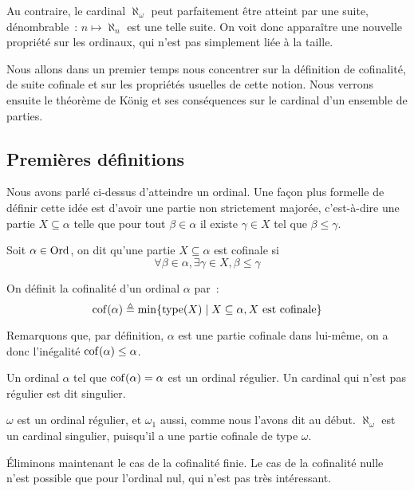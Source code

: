 Au contraire, le cardinal $\aleph_\omega$ peut parfaitement être atteint par
une suite, dénombrable~: $n \mapsto \aleph_n$ est une telle suite. On voit donc
apparaître une nouvelle propriété sur les ordinaux, qui n'est pas simplement
liée à la taille.

Nous allons dans un premier temps nous concentrer sur la définition de
cofinalité, de suite cofinale et sur les propriétés usuelles de cette notion.
Nous verrons ensuite le théorème de König et ses conséquences sur le cardinal
d'un ensemble de parties.

\subsection{Premières définitions}

Nous avons parlé ci-dessus d'atteindre un ordinal. Une façon plus formelle de
définir cette idée est d'avoir une partie non strictement majorée, c'est-à-dire
une partie $X\subseteq \alpha$ telle que pour tout $\beta \in \alpha$ il existe
$\gamma \in X$ tel que $\beta \leq \gamma$.

\begin{definition}[Cofinalité]
  Soit $\alpha\in\operatorname{Ord}$, on dit qu'une partie $X\subseteq \alpha$ est cofinale si
  \[\forall \beta \in \alpha, \exists \gamma \in X, \beta \leq \gamma\]

  On définit la cofinalité d'un ordinal $\alpha$ par~:
  \[\operatorname{cof}(\alpha) \triangleq \min \{\operatorname{type}(X)
  \mid X\subseteq\alpha, X\text{ est cofinale}\}\]
\end{definition}

Remarquons que, par définition, $\alpha$ est une partie cofinale dans lui-même,
on a donc l'inégalité $\operatorname{cof}(\alpha) \leq \alpha$.

\begin{definition}
  Un ordinal $\alpha$ tel que $\operatorname{cof}(\alpha) = \alpha$ est un ordinal régulier.
  Un cardinal qui n'est pas régulier est dit singulier.
\end{definition}

\begin{example}
  $\omega$ est un ordinal régulier, et $\omega_1$ aussi, comme nous l'avons dit
  au début. $\aleph_\omega$ est un cardinal singulier, puisqu'il a une partie
  cofinale de type $\omega$.
\end{example}

\'Eliminons maintenant le cas de la cofinalité finie. Le cas de la cofinalité
nulle n'est possible que pour l'ordinal nul, qui n'est pas très intéressant.

